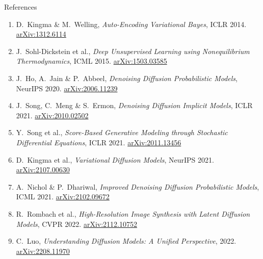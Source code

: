 \documentclass[aspectratio=169,11pt]{beamer}
\begin{document}
\begin{frame}{References}

\begin{enumerate}\small
  \setlength\itemsep{4pt}
  \item D.\ Kingma \& M.\ Welling, \emph{Auto-Encoding Variational Bayes},
        ICLR 2014. \href{https://arxiv.org/abs/1312.6114}{arXiv:1312.6114}

  \item J.\ Sohl-Dickstein et al., \emph{Deep Unsupervised Learning using
        Nonequilibrium Thermodynamics}, ICML 2015.
        \href{https://arxiv.org/abs/1503.03585}{arXiv:1503.03585}

  \item J.\ Ho, A.\ Jain \& P.\ Abbeel, \emph{Denoising Diffusion Probabilistic
        Models}, NeurIPS 2020. \href{https://arxiv.org/abs/2006.11239}{arXiv:2006.11239}

  \item J.\ Song, C.\ Meng \& S.\ Ermon, \emph{Denoising Diffusion Implicit
        Models}, ICLR 2021. \href{https://arxiv.org/abs/2010.02502}{arXiv:2010.02502}

  \item Y.\ Song et al., \emph{Score-Based Generative Modeling through
        Stochastic Differential Equations}, ICLR 2021.
        \href{https://arxiv.org/abs/2011.13456}{arXiv:2011.13456}

  \item D.\ Kingma et al., \emph{Variational Diffusion Models}, NeurIPS 2021.
        \href{https://arxiv.org/abs/2107.00630}{arXiv:2107.00630}

  \item A.\ Nichol \& P.\ Dhariwal, \emph{Improved Denoising Diffusion
        Probabilistic Models}, ICML 2021.
        \href{https://arxiv.org/abs/2102.09672}{arXiv:2102.09672}

  \item R.\ Rombach et al., \emph{High-Resolution Image Synthesis with
        Latent Diffusion Models}, CVPR 2022.
        \href{https://arxiv.org/abs/2112.10752}{arXiv:2112.10752}

  \item C.\ Luo, \emph{Understanding Diffusion Models: A Unified Perspective},
        2022. \href{https://arxiv.org/abs/2208.11970}{arXiv:2208.11970}
\end{enumerate}
\end{frame}
\end{document}

